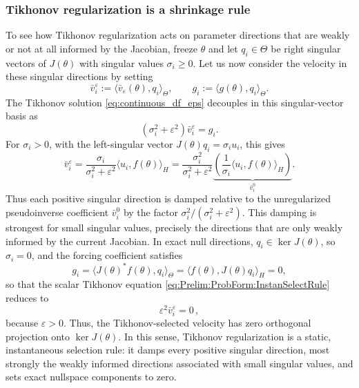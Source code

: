 \documentclass[oneside,11pt]{article}
\theoremstyle{remark}
\theoremstyle{thmstyleone}
\theoremstyle{thmstylethree}
\theoremstyle{thmstyletwo}
\newcommand{\ip}[2]{\langle #1,#2\rangle}
\begin{document}
\subsubsection{Tikhonov regularization is a  shrinkage rule} To see how Tikhonov regularization acts on parameter directions that are weakly or not at all informed by the Jacobian, freeze $\theta$ and let  $q_i\in\Theta$ be right singular vectors of $J(\theta)$ with singular values $\sigma_i\ge 0$. Let us now consider the velocity in these singular directions by setting
\[
  \bar{v}_i^\varepsilon:=\ip{\bar v_\varepsilon(\theta)}{q_i}_\Theta,
  \qquad
  g_i:=\ip{g(\theta)}{q_i}_\Theta .
\]
The Tikhonov solution \eqref{eq:continuous_df_eps} 
decouples in this singular-vector basis as
\begin{equation}\label{eq:Prelim:ProbForm:InstanSelectRule}
  (\sigma_i^2+\varepsilon^2)\bar{v}_i^\varepsilon=g_i .
\end{equation}
For $\sigma_i>0$, with the left-singular vector $J(\theta)q_i=\sigma_i u_i$, this gives
\begin{equation}\label{eq:Prelim:ProbForm:DampedRuleABC}
  \bar{v}_i^\varepsilon
  =
  \frac{\sigma_i}{\sigma_i^2+\varepsilon^2}
  \ip{u_i}{f(\theta)}_H
  =
  \frac{\sigma_i^2}{\sigma_i^2+\varepsilon^2}
  \underbrace{\left(
    \frac{1}{\sigma_i}\ip{u_i}{f(\theta)}_H
  \right)}_{\bar{v}_i^0}.
\end{equation}
Thus each positive singular direction is damped relative to the unregularized
pseudoinverse coefficient $\bar{v}_i^0$ by the factor $\sigma_i^2/({\sigma_i^2+\varepsilon^2})$. 
This damping is strongest for small singular values, precisely the directions that are only weakly informed by the current Jacobian. In exact null directions, $q_i\in\ker J(\theta)$, so $\sigma_i=0$, and the forcing coefficient satisfies
\[
  g_i
  =
  \ip{J(\theta)^*f(\theta)}{q_i}_\Theta
  =
  \ip{f(\theta)}{J(\theta)q_i}_H
  =
  0,
\]
so that the scalar Tikhonov equation \eqref{eq:Prelim:ProbForm:InstanSelectRule} reduces to
\begin{equation}\label{eq:Prelim:ProbForm:HelperEps0}
  \varepsilon^2 \bar{v}_i^\varepsilon=0\,,
\end{equation}
because $\varepsilon > 0$. Thus, the Tikhonov-selected velocity has zero orthogonal projection onto $\ker J(\theta)$. 
In this sense, Tikhonov regularization is a static, instantaneous selection rule: it damps every positive singular direction, most strongly the weakly informed directions associated with small singular values, and sets exact nullspace components to zero. 
\end{document}
